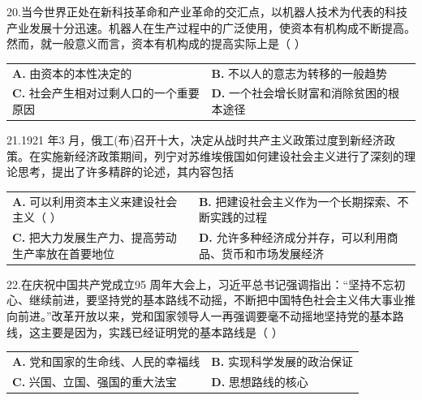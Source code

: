 \documentclass[UTF8,11pt]{ctexart}
\begin{document}
20.当今世界正处在新科技革命和产业革命的交汇点，以机器人技术为代表的科技产业发展十分迅速。机器人在生产过程中的广泛使用，使资本有机构成不断提高。然而，就一般意义而言，资本有机构成的提高实际上是（     ）


\begin{center}\begin{tabular}{>{\raggedright\arraybackslash}p{\dimexpr(\linewidth-4\tabcolsep)/2\relax}>{\raggedright\arraybackslash}p{\dimexpr(\linewidth-4\tabcolsep)/2\relax}}
\textbf{A.} 由资本的本性决定的 & \textbf{B.} 不以人的意志为转移的一般趋势\\[.35em]
\textbf{C.} 社会产生相对过剩人口的一个重要原因 & \textbf{D.} 一个社会增长财富和消除贫困的根本途径\\[.35em]\end{tabular}\end{center}

21.1921 年3 月，俄工(布)召开十大，决定从战时共产主义政策过度到新经济政策。在实施新经济政策期间，列宁对苏维埃俄国如何建设社会主义进行了深刻的理论思考，提出了许多精辟的论述，其内容包括


\begin{center}\begin{tabular}{>{\raggedright\arraybackslash}p{\dimexpr(\linewidth-4\tabcolsep)/2\relax}>{\raggedright\arraybackslash}p{\dimexpr(\linewidth-4\tabcolsep)/2\relax}}
\textbf{A.} 可以利用资本主义来建设社会主义（     ） & \textbf{B.} 把建设社会主义作为一个长期探索、不断实践的过程\\[.35em]
\textbf{C.} 把大力发展生产力、提高劳动生产率放在首要地位 & \textbf{D.} 允许多种经济成分并存，可以利用商品、货币和市场发展经济\\[.35em]\end{tabular}\end{center}

22.在庆祝中国共产党成立95 周年大会上，习近平总书记强调指出：“坚持不忘初心、继续前进，要坚持党的基本路线不动摇，不断把中国特色社会主义伟大事业推向前进。”改革开放以来，党和国家领导人一再强调要毫不动摇地坚持党的基本路线，这主要是因为，实践已经证明党的基本路线是（     ）


\begin{center}\begin{tabular}{>{\raggedright\arraybackslash}p{\dimexpr(\linewidth-4\tabcolsep)/2\relax}>{\raggedright\arraybackslash}p{\dimexpr(\linewidth-4\tabcolsep)/2\relax}}
\textbf{A.} 党和国家的生命线、人民的幸福线 & \textbf{B.} 实现科学发展的政治保证\\[.35em]
\textbf{C.} 兴国、立国、强国的重大法宝 & \textbf{D.} 思想路线的核心\\[.35em]\end{tabular}\end{center}
\end{document}
